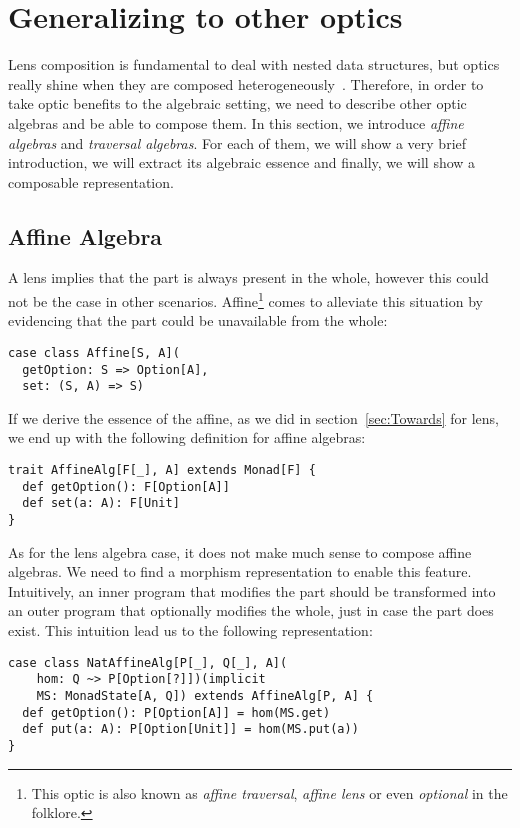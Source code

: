 \documentclass[preview, 3p]{elsarticle}
\begin{document}
\section{Generalizing to other optics}
\label{sec:Generalizing}

Lens composition is fundamental to deal with nested data structures, but optics
really shine when they are composed
heterogeneously~\cite{pickering2017profunctor}. Therefore, in order to take
optic benefits to the algebraic setting, we need to describe other optic
algebras and be able to compose them. In this section, we introduce \emph{affine
algebras} and \emph{traversal algebras}. For each of them, we will show a very
brief introduction, we will extract its algebraic essence and finally, we will
show a composable representation.

\subsection{Affine Algebra}

A lens implies that the part is always present in the whole, however this could
not be the case in other scenarios. Affine\footnote{This optic is also known as
\emph{affine traversal}, \emph{affine lens} or even \emph{optional} in the
folklore.} comes to alleviate this situation by evidencing that the part could
be unavailable from the whole:

\begin{lstlisting}
case class Affine[S, A](
  getOption: S => Option[A],
  set: (S, A) => S)
\end{lstlisting}

If we derive the essence of the affine, as we did in section~\ref{sec:Towards}
for lens, we end up with the following definition for affine algebras:

\begin{lstlisting}
trait AffineAlg[F[_], A] extends Monad[F] {
  def getOption(): F[Option[A]]
  def set(a: A): F[Unit]
}
\end{lstlisting}

As for the lens algebra case, it does not make much sense to compose affine
algebras. We need to find a morphism representation to enable this feature.
Intuitively, an inner program that modifies the part should be transformed into
an outer program that optionally modifies the whole, just in case the part does
exist. This intuition lead us to the following representation:

\begin{lstlisting}
case class NatAffineAlg[P[_], Q[_], A](
    hom: Q ~> P[Option[?]])(implicit
    MS: MonadState[A, Q]) extends AffineAlg[P, A] {
  def getOption(): P[Option[A]] = hom(MS.get)
  def put(a: A): P[Option[Unit]] = hom(MS.put(a))
}
\end{lstlisting}
\end{document}
